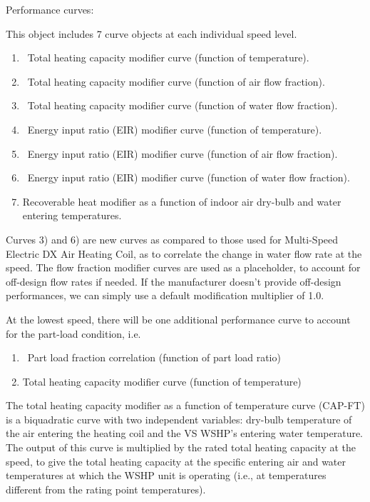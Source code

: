 Performance curves:

This object includes 7 curve objects at each individual speed level.

\begin{enumerate}
\def\labelenumi{\arabic{enumi})}
\item
  ~Total heating capacity modifier curve (function of temperature).
\item
  ~Total heating capacity modifier curve (function of air flow fraction).
\item
  ~Total heating capacity modifier curve (function of water flow fraction).
\item
  ~Energy input ratio (EIR) modifier curve (function of temperature).
\item
  ~Energy input ratio (EIR) modifier curve (function of air flow fraction).
\item
  ~Energy input ratio (EIR) modifier curve (function of water flow fraction).
\item
  Recoverable heat modifier as a function of indoor air dry-bulb and water entering temperatures.
\end{enumerate}

Curves 3) and 6) are new curves as compared to those used for Multi-Speed Electric DX Air Heating Coil, as to correlate the change in water flow rate at the speed. The flow fraction modifier curves are used as a placeholder, to account for off-design flow rates if needed. If the manufacturer doesn't provide off-design performances, we can simply use a default modification multiplier of 1.0.

At the lowest speed, there will be one additional performance curve to account for the part-load condition, i.e.

\begin{enumerate}
\def\labelenumi{\arabic{enumi})}
\setcounter{enumi}{7}
\item
  ~Part load fraction correlation (function of part load ratio)
\item
  Total heating capacity modifier curve (function of temperature)
\end{enumerate}

The total heating capacity modifier as a function of temperature curve (CAP-FT) is a biquadratic curve with two independent variables: dry-bulb temperature of the air entering the heating coil and the VS WSHP's entering water temperature. The output of this curve is multiplied by the rated total heating capacity at the speed, to give the total heating capacity at the specific entering air and water temperatures at which the WSHP unit is operating (i.e., at temperatures different from the rating point temperatures).

